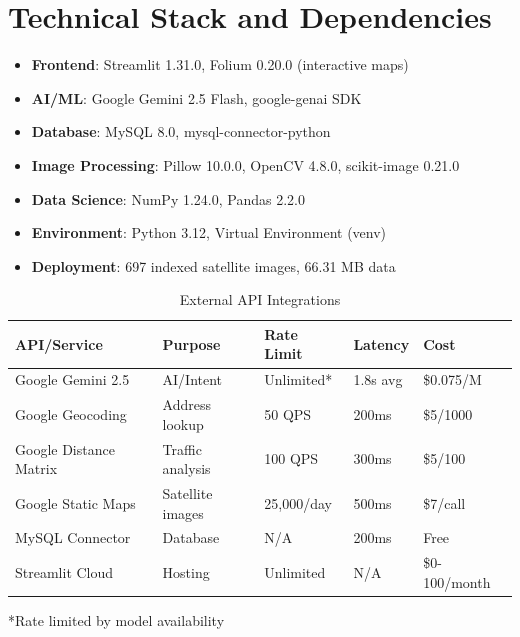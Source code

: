 \documentclass[11pt,a4paper]{article}
\begin{document}
\section{Technical Stack and Dependencies}

\begin{itemize}
    \item \textbf{Frontend}: Streamlit 1.31.0, Folium 0.20.0 (interactive maps)
    \item \textbf{AI/ML}: Google Gemini 2.5 Flash, google-genai SDK
    \item \textbf{Database}: MySQL 8.0, mysql-connector-python
    \item \textbf{Image Processing}: Pillow 10.0.0, OpenCV 4.8.0, scikit-image 0.21.0
    \item \textbf{Data Science}: NumPy 1.24.0, Pandas 2.2.0
    \item \textbf{Environment}: Python 3.12, Virtual Environment (venv)
    \item \textbf{Deployment}: 697 indexed satellite images, 66.31 MB data
\end{itemize}

\begin{table}[H]
\centering
\caption{External API Integrations}
\label{tab:api_integration}
\begin{tabular}{|l|l|l|l|l|}
\hline
\textbf{API/Service} & \textbf{Purpose} & \textbf{Rate Limit} & \textbf{Latency} & \textbf{Cost} \\
\hline
Google Gemini 2.5 & AI/Intent & Unlimited* & 1.8s avg & \$0.075/M \\
Google Geocoding & Address lookup & 50 QPS & 200ms & \$5/1000 \\
Google Distance Matrix & Traffic analysis & 100 QPS & 300ms & \$5/100 \\
Google Static Maps & Satellite images & 25,000/day & 500ms & \$7/call \\
MySQL Connector & Database & N/A & 200ms & Free \\
Streamlit Cloud & Hosting & Unlimited & N/A & \$0-100/month \\
\hline
\end{tabular}

*Rate limited by model availability
\end{table}
\end{document}
